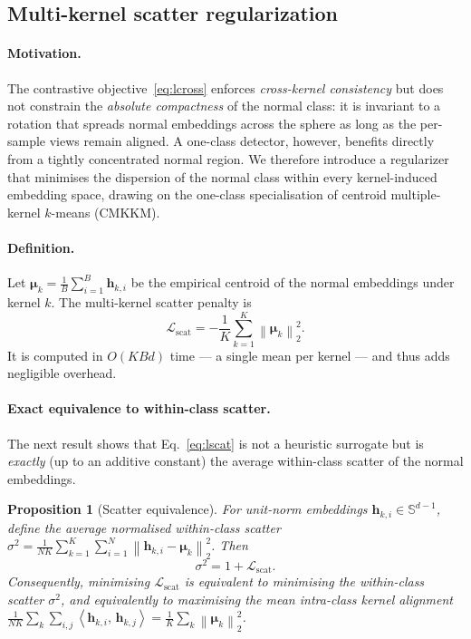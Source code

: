 \documentclass[preprint,12pt]{elsarticle}
\newtheorem{proposition}{Proposition}
\newcommand{\Sph}{\mathbb{S}}
\newcommand{\norm}[1]{\left\lVert #1 \right\rVert}
\newcommand{\inner}[2]{\left\langle #1,\, #2 \right\rangle}
\newcommand{\Lscat}{\mathcal{L}_{\mathrm{scat}}}
\newcommand{\hh}{\bm{h}}
\newcommand{\mmu}{\bm{\mu}}
\begin{document}
\subsection{Multi-kernel scatter regularization}
\label{subsec:scatter}

\paragraph{Motivation.}
The contrastive objective~\eqref{eq:lcross} enforces \emph{cross-kernel
consistency} but does not constrain the \emph{absolute compactness} of the
normal class: it is invariant to a rotation that spreads normal embeddings
across the sphere as long as the per-sample views remain aligned. A one-class
detector, however, benefits directly from a tightly concentrated normal region.
We therefore introduce a regularizer that minimises the dispersion of the normal
class within every kernel-induced embedding space, drawing on the one-class
specialisation of centroid multiple-kernel $k$-means (CMKKM).

\paragraph{Definition.}
Let $\mmu_k=\frac{1}{B}\sum_{i=1}^{B}\hh_{k,i}$ be the empirical centroid of the
normal embeddings under kernel $k$. The multi-kernel scatter penalty is
\begin{equation}
\Lscat
=-\frac{1}{K}\sum_{k=1}^{K}\norm{\mmu_k}_2^{2}.
\label{eq:lscat}
\end{equation}
It is computed in $O(KBd)$ time --- a single mean per kernel --- and thus adds
negligible overhead.

\paragraph{Exact equivalence to within-class scatter.}
The next result shows that Eq.~\eqref{eq:lscat} is not a heuristic surrogate but
is \emph{exactly} (up to an additive constant) the average within-class scatter
of the normal embeddings.

\begin{proposition}[Scatter equivalence]
\label{prop:scatter}
For unit-norm embeddings $\hh_{k,i}\in\Sph^{d-1}$, define the average normalised
within-class scatter
$\sigma^2=\frac{1}{NK}\sum_{k=1}^{K}\sum_{i=1}^{N}\norm{\hh_{k,i}-\mmu_k}_2^{2}$.
Then
\begin{equation}
\sigma^2 = 1 + \Lscat .
\label{eq:equiv}
\end{equation}
Consequently, minimising $\Lscat$ is equivalent to minimising the within-class
scatter $\sigma^2$, and equivalently to maximising the mean intra-class kernel
alignment $\frac{1}{NK}\sum_k\sum_{i,j}\inner{\hh_{k,i}}{\hh_{k,j}}
=\frac{1}{K}\sum_k\norm{\mmu_k}_2^2$.
\end{proposition}
\end{document}
